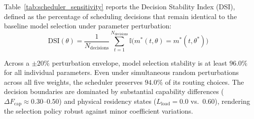 Table~\ref{tab:scheduler_sensitivity} reports the Decision Stability Index (DSI), defined as the percentage of scheduling decisions that remain identical to the baseline model selection under parameter perturbation:
\begin{equation}
\text{DSI}(\theta) = \frac{1}{N_{\text{decisions}}} \sum_{t=1}^{N_{\text{decisions}}} \mathbb{I}\Big(m^*(t, \theta) = m^*(t, \theta^*)\Big)
\end{equation}

\begin{table}[t]
\small
\centering
\caption{Scheduler Decision Stability Index (DSI) under $\pm 20\%$ and $\pm 30\%$ Hyperparameter Perturbations across 50 Benchmark Stages.}
\label{tab:scheduler_sensitivity}
\end{table}

Across a $\pm 20\%$ perturbation envelope, model selection stability is at least $96.0\%$ for all individual parameters. Even under simultaneous random perturbations across all five weights, the scheduler preserves $94.0\%$ of its routing choices. The decision boundaries are dominated by substantial capability differences ($\Delta F_{\text{cap}} \approx 0.30$--$0.50$) and physical residency states ($L_{\text{load}} = 0.0$ vs.\ $0.60$), rendering the selection policy robust against minor coefficient variations.


